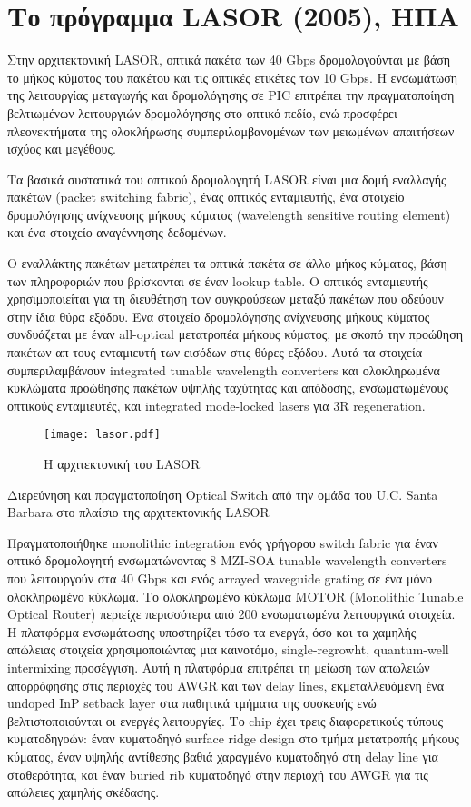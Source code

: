 ﻿
\section{Το πρόγραμμα LASOR (2005), ΗΠΑ}

Στην αρχιτεκτονική LASOR, οπτικά πακέτα των 40 Gbps δρομολογούνται με
βάση το μήκος κύματος του πακέτου και τις οπτικές ετικέτες των 10
Gbps. Η ενσωμάτωση της λειτουργίας μεταγωγής και δρομολόγησης σε PIC
επιτρέπει την πραγματοποίηση βελτιωμένων λειτουργιών δρομολόγησης στο
οπτικό πεδίο, ενώ προσφέρει πλεονεκτήματα της ολοκλήρωσης
συμπεριλαμβανομένων των μειωμένων απαιτήσεων ισχύος και μεγέθους.

Τα βασικά συστατικά του οπτικού δρομολογητή LASΟR \cite{1584172} είναι
μια δομή εναλλαγής πακέτων (packet switching fabric), ένας οπτικός
ενταμιευτής, ένα στοιχείο δρομολόγησης ανίχνευσης μήκους κύματος
(wavelength sensitive routing element) και ένα στοιχείο αναγέννησης
δεδομένων.

Ο εναλλάκτης πακέτων μετατρέπει τα οπτικά πακέτα σε άλλο μήκος
κύματος, βάση των πληροφοριών που βρίσκονται σε έναν lookup table. Ο
οπτικός ενταμιευτής χρησιμοποιείται για τη διευθέτηση των συγκρούσεων
μεταξύ πακέτων που οδεύουν στην ίδια θύρα εξόδου. Ένα στοιχείο
δρομολόγησης ανίχνευσης μήκους κύματος συνδυάζεται με έναν all-optical
μετατροπέα μήκους κύματος, με σκοπό την προώθηση πακέτων απ τους
ενταμιευτή των εισόδων στις θύρες εξόδου. Αυτά τα στοιχεία
συμπεριλαμβάνουν integrated tunable wavelength converters και
ολοκληρωμένα κυκλώματα προώθησης πακέτων υψηλής ταχύτητας και
απόδοσης, ενσωματωμένους οπτικούς ενταμιευτές, και integrated 
mode-locked lasers για 3R regeneration.

\begin{figure}[h]
  \centering
  \texttt{[image: lasor.pdf]}
  \caption{Η αρχιτεκτονική του LASOR}
  \label{fig:lasor}
\end{figure}

Διερεύνηση και πραγματοποίηση Optical Switch από την ομάδα του U.C.
Santa Barbara στο πλαίσιο της αρχιτεκτονικής LASOR

Πραγματοποιήθηκε monolithic integration ενός γρήγορου switch fabric
για έναν οπτικό δρομολογητή ενσωματώνοντας 8 MZI-SOA tunable
wavelength converters που λειτουργούν στα 40 Gbps και ενός arrayed
waveguide grating σε ένα μόνο ολοκληρωμένο κύκλωμα. \cite{5515982} Το
ολοκληρωμένο κύκλωμα MOTOR (Monolithic Tunable Optical Router)
περιείχε περισσότερα από 200 ενσωματωμένα λειτουργικά στοιχεία. Η
πλατφόρμα ενσωμάτωσης υποστηρίζει τόσο τα ενεργά, όσο και τα χαμηλής
απώλειας στοιχεία χρησιμοποιώντας μια καινοτόμο, single-regrowht,
quantum-well intermixing προσέγγιση. Αυτή η πλατφόρμα επιτρέπει τη
μείωση των απωλειών απορρόφησης στις περιοχές του AWGR και των delay
lines, εκμεταλλευόμενη ένα undoped InP setback layer στα παθητικά
τμήματα της συσκευής ενώ βελτιστοποιούνται οι ενεργές λειτουργίες.  Το
chip έχει τρεις διαφορετικούς τύπους κυματοδηγοών: έναν κυματοδηγό
surface ridge design στο τμήμα μετατροπής μήκους κύματος, έναν υψηλής
αντίθεσης βαθιά χαραγμένο κυματοδηγό στη delay line για σταθερότητα,
και έναν buried rib κυματοδηγό στην περιοχή του AWGR για τις απώλειες
χαμηλής σκέδασης.

